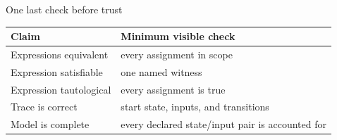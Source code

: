 \begin{frame}{One last check before trust}
\begin{tabular}{@{}p{4.3cm}p{7.8cm}@{}}
\textbf{Claim} & \textbf{Minimum visible check}\\\midrule
Expressions equivalent & every assignment in scope\\[4pt]
Expression satisfiable & one named witness\\[4pt]
Expression tautological & every assignment is true\\[4pt]
Trace is correct & start state, inputs, and transitions\\[4pt]
Model is complete & every declared state/input pair is accounted for
\end{tabular}
\end{frame}
